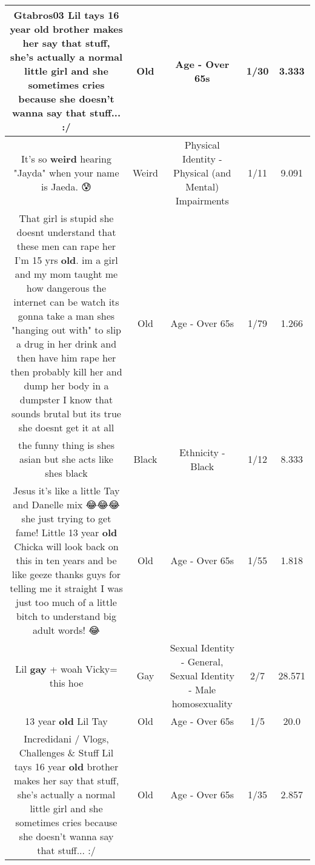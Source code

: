 \documentclass[11pt]{article}
\newlength\mylength
\begin{document}
\begin{center}
\begin{longtable}{|C{.65\mylength}|C{.30\mylength}|C{.12\mylength}|C{.12\mylength}|C{.12\mylength}|}
  \small Gtabros03 Lil tays 16 year \textbf{old} brother makes her say that stuff, she's actually a normal little girl and she sometimes cries because she doesn't wanna say that stuff... :/\normalsize   & Old & Age - Over 65s & 1/30 & 3.333 \\  \hline
  \small It's so \textbf{weird} hearing "Jayda" when your name is Jaeda. 😰\normalsize   & Weird & Physical Identity - Physical (and Mental) Impairments & 1/11 & 9.091 \\  \hline
  \small That girl is stupid she doesnt understand that these men can rape her I'm 15 yrs \textbf{old}.  im a girl and my mom taught me how dangerous the internet can be watch its gonna take a man shes "hanging out with" to slip a drug in her drink and then have him rape her then probably kill her and dump her  body in a dumpster I know that sounds brutal but its true she doesnt get it at all\normalsize   & Old & Age - Over 65s & 1/79 & 1.266 \\  \hline
  \small the funny thing is shes asian but she acts like shes black\normalsize   & Black & Ethnicity - Black & 1/12 & 8.333 \\  \hline
  \small Jesus it's like a little Tay and Danelle mix 😂😂😂 she just trying to get fame! Little 13 year \textbf{old} Chicka will look back on this in ten years and be like geeze thanks guys for telling me it straight I was just too much of a little bitch to understand big adult words! 😂\normalsize   & Old & Age - Over 65s & 1/55 & 1.818 \\  \hline
  \small Lil \textbf{g\textbf{ay}} + woah Vicky= this hoe\normalsize   & Gay & Sexual Identity - General, Sexual Identity - Male homosexuality & 2/7 & 28.571 \\  \hline
  \small 13 year \textbf{old} Lil Tay\normalsize   & Old & Age - Over 65s & 1/5 & 20.0 \\  \hline
  \small Incredidani / Vlogs, Challenges \& Stuff Lil tays 16 year \textbf{old} brother makes her say that stuff, she's actually a normal little girl and she sometimes cries because she doesn't wanna say that stuff... :/\normalsize   & Old & Age - Over 65s & 1/35 & 2.857 \\  \hline

\end{longtable}
\end{center}
\end{document}
